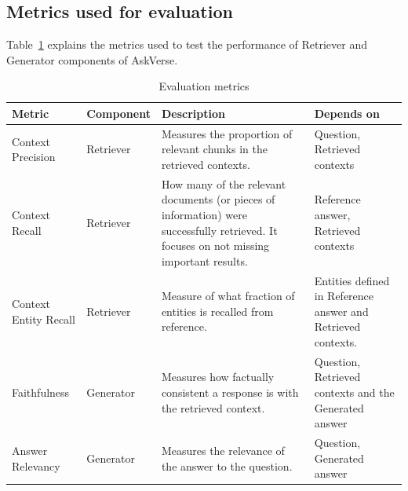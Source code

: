 \documentclass[default]{sn-jnl}%
\begin{document}
\subsection*{Metrics used for evaluation}
Table~\ref{tab1} explains the metrics used to test the performance of Retriever and Generator components of AskVerse.
\begin{table}[h]
\caption{Evaluation metrics}\label{tab1}%
\renewcommand{\arraystretch}{1.2}
\setlength{\tabcolsep}{4pt}
\begin{tabular}{|p{2.5cm}|p{2cm}|p{4cm}|p{4cm}|}
\hline
\textbf{Metric} & \textbf{Component} & \textbf{Description} & \textbf{Depends on} \\
\hline
Context Precision & Retriever & Measures the proportion of relevant chunks in the retrieved contexts. & Question, Retrieved contexts \\
\hline
Context Recall & Retriever & How many of the relevant documents (or pieces of information) were successfully retrieved. It focuses on not missing important results. & Reference answer, Retrieved contexts \\
\hline
Context Entity Recall & Retriever & Measure of what fraction of entities is recalled from reference. & Entities defined in Reference answer and Retrieved contexts. \\
\hline
Faithfulness & Generator & Measures how factually consistent a response is with the retrieved context. & Question, Retrieved contexts and the Generated answer \\
\hline
Answer Relevancy & Generator & Measures the relevance of the answer to the question. & Question, Generated answer \\
\hline
\end{tabular}
\end{table}
\end{document}
